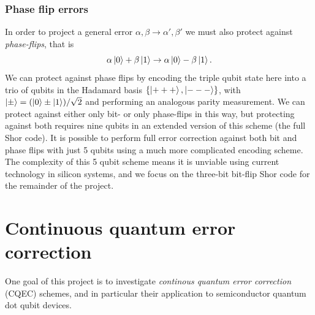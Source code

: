 \documentclass{report}
\begin{document}
\subsubsection{Phase flip errors}

In order to project a general error $\alpha, \beta \rightarrow \alpha', \beta'$ we must also protect against \textit{phase-flips}, that is 
\begin{equation}
    \alpha\ket{0} + \beta\ket{1} \rightarrow \alpha\ket{0} - \beta\ket{1}.
\end{equation}
We can protect against phase flips by encoding the triple qubit state here into a trio of qubits in the Hadamard basis $\{\ket{+++},\ket{---}\}$, with $\ket{\pm} = (\ket{0} \pm \ket{1})/\sqrt{2}$ and performing an analogous parity measurement. We can protect against either only bit- or only phase-flips in this way, but protecting against both requires nine qubits in an extended version of this scheme (the full Shor code). It is possible to perform full error correction against both bit and phase flips with just 5 qubits  using a much more complicated encoding scheme\cite{DiVincenzo1996}. The complexity of this 5 qubit scheme means it is unviable using current technology in silicon systems, and we focus on the three-bit bit-flip Shor code for the remainder of the project.


\section{Continuous quantum error correction}\label{sec:CQEC}
One goal of this project is to investigate \textit{continous quantum error correction} (CQEC) schemes, and in particular their application to semiconductor quantum dot qubit devices. 
\end{document}
